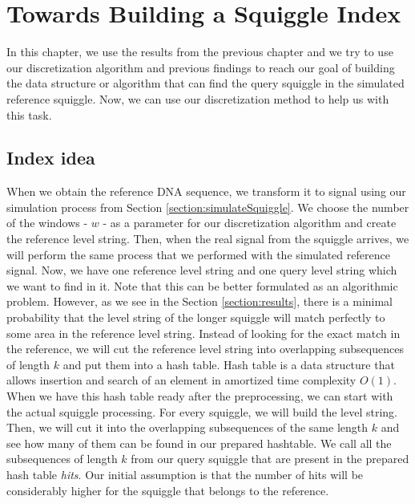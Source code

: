 \chapter{Towards Building a Squiggle Index}

\label{kap:methAdjust} %

In this chapter, we use the results from the previous chapter and we try to use our
discretization algorithm and previous findings to reach our goal of building the
data structure or algorithm that can find the query squiggle in the simulated
reference squiggle. Now, we can use our discretization method to help us with this task.

\section{Index idea}
\label{section:indexIdea}

When we obtain the reference DNA sequence, we transform it to signal using our simulation
process from Section \ref{section:simulateSquiggle}. We choose the number of the windows - $w$ -
as a parameter for our discretization algorithm and create the reference level string.
Then, when the real signal from the squiggle arrives, we will perform the same process
that we performed with the simulated reference signal. Now, we have one reference level string and
one query level string which we want to find in it. Note that this can be better formulated as an
algorithmic problem. However, as we see in the Section \ref{section:results}, there is a minimal probability that the level string
of the longer squiggle will match perfectly to some area in the reference level string.
Instead of looking for the exact match in the reference, we will cut the reference
level string into overlapping subsequences of length $k$ and put them into a hash table.
Hash table is a data structure that allows insertion and search of an element in
amortized time complexity $O(1)$. When we have this hash table ready after the
preprocessing, we can start with the actual squiggle processing. For every squiggle, we will
build the level string. Then, we will cut it into the overlapping
subsequences of the same length $k$ and see how many of them can be found in our
prepared hashtable. We call all the subsequences of length $k$ from our query squiggle that are
present in the prepared hash table \textit{hits}. Our initial assumption is that the number
of hits will be considerably higher for the squiggle that belongs to the reference.

